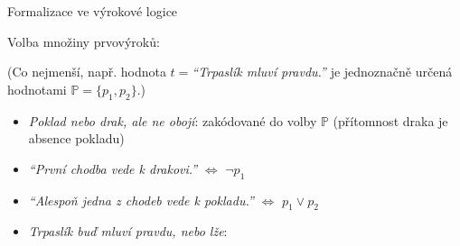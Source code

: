 \documentclass{beamer}
\begin{document}
\begin{frame}{Formalizace ve výrokové logice}

    Volba množiny prvovýroků: 

    \pause
    

    \pause

    (Co nejmenší, např. hodnota $t=${\it ``Trpaslík mluví pravdu.''} je jednoznačně určená hodnotami $\mathbb P=\{p_1,p_2\}$.)
    
    \pause

    \begin{itemize}
        \item {\it Poklad nebo drak, ale ne obojí}: zakódované do volby $\mathbb P$ (přítomnost draka je absence pokladu)
        \item {\it ``První chodba vede k drakovi.''} $\Leftrightarrow$ \alert{$\neg p_1$}
        \item {\it ``Alespoň jedna z chodeb vede k pokladu.''} $\Leftrightarrow$ \alert{$p_1 \lor p_2$}
        \item {\it Trpaslík buď mluví pravdu, nebo lže}:
    \end{itemize}

    \pause

    \medskip

\end{frame}
\end{document}
